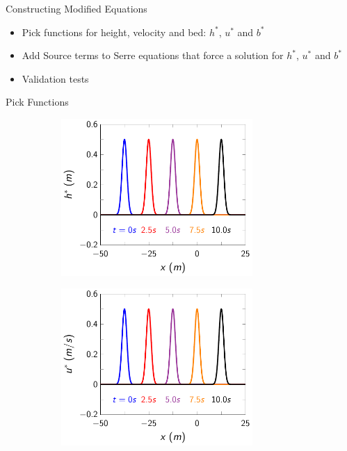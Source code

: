 \documentclass[pdf]{beamer}
\begin{document}
\begin{frame}{Constructing Modified Equations}
	\begin{itemize}
		\item Pick functions for height, velocity and bed: $h^*$, $u^*$ and $b^*$
		\item Add Source terms to Serre equations that force a solution for $h^*$, $u^*$ and $b^*$
		\item Validation tests
	\end{itemize}
\end{frame}
\begin{frame}{Pick Functions}

\begin{figure}
	\centering
	\begin{subfigure}{0.5\textwidth}
		\includegraphics[width=0.8\textwidth]{./Pics/DryBed/Forced/h.pdf}
	\end{subfigure}%
	\begin{subfigure}{0.5\textwidth}
		\includegraphics[width=0.8\textwidth]{./Pics/DryBed/Forced/u.pdf}

\end{subfigure}
\end{figure}
\end{frame}
\end{document}
